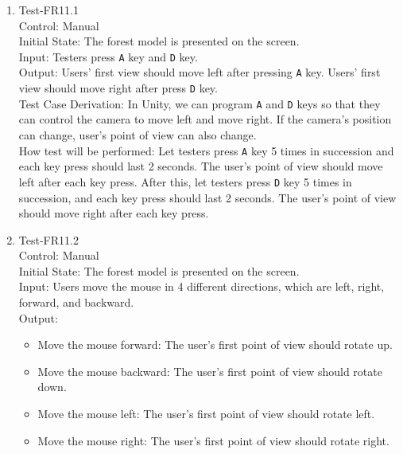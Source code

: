 \documentclass[12pt, titlepage]{article}
\begin{document}
\begin{enumerate}
\item{Test-FR11.1\\}
Control: Manual\\ 

Initial State: The forest model is presented on the screen.\\

Input: Testers press \verb|A| key and \verb|D| key.\\

Output: Users' first view should move left after pressing \verb|A| key. Users'
first view should move right after press \verb|D| key.\\

Test Case Derivation: In Unity, we can program \verb|A| and \verb|D| keys so that 
they can control the camera to move left and move right. If the camera's position 
can change, user's point of view can also change.\\
					
How test will be performed: Let testers press \verb|A| key 5 times in succession 
and each key press should last 2 seconds.  The user's point of view should move left
after each key press. After this, let testers press \verb|D| key 5 times in 
succession, and each key press should last 2 seconds. The user's point of view 
should move right after each key press.

\item{Test-FR11.2\\}
Control: Manual\\ 

Initial State: The forest model is presented on the screen.\\

Input: Users move the mouse in 4 different directions, which are left, right, 
forward, and backward.\\

Output:
\begin{itemize}
    \item Move the mouse forward: The user's first point of view should rotate up.
    \item Move the mouse backward: The user's first point of view should rotate 
    down.
    \item Move the mouse left: The user's first point of view should rotate left.
    \item Move the mouse right: The user's first point of view should rotate right.
\end{itemize}


\end{enumerate}
\end{document}
